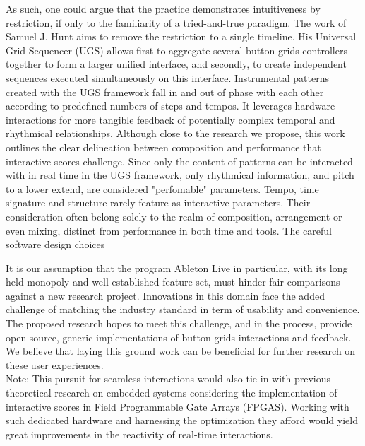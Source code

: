 \documentclass[journal,onecolumn]{IEEEtran}
\begin{document}
As such, one could argue that the practice demonstrates intuitiveness by restriction, if only to the familiarity of a tried-and-true paradigm. The work of Samuel J. Hunt\cite{hunt:poly} aims to remove the restriction to a single timeline. His Universal Grid Sequencer (UGS) allows first to aggregate several button grids controllers together to form a larger unified interface, and secondly, to create independent sequences executed simultaneously on this interface. Instrumental patterns created with the UGS framework fall in and out of phase with each other according to predefined numbers of steps and tempos. It leverages hardware interactions for more tangible feedback of potentially complex temporal and rhythmical relationships. Although close to the research we propose, this work outlines the clear delineation between composition and performance that interactive scores challenge. Since only the content of patterns can be interacted with in real time in the UGS framework, only rhythmical information, and pitch to a lower extend, are considered "perfomable" parameters. Tempo, time signature and structure rarely feature as interactive parameters. Their consideration often belong solely to the realm of composition, arrangement or even mixing, distinct from performance in both time and tools.
The careful software design choices

It is our assumption that the program Ableton Live in particular, with its long held monopoly and well established feature set, must hinder fair comparisons against a new research project. Innovations in this domain face the added challenge of matching the industry standard in term of usability and convenience. The proposed research hopes to meet this challenge, and in the process, provide open source, generic implementations of button grids interactions and feedback. We believe that laying this ground work can be beneficial for further research on these user experiences. \\

Note: This pursuit for seamless interactions would also tie in with previous theoretical research on embedded systems considering the implementation of interactive scores in Field Programmable Gate Arrays (FPGAS)\cite{arias:fpga}. Working with such dedicated hardware and harnessing the optimization they afford would yield great improvements in the reactivity of real-time interactions\cite{popoff:fpga}. 

\end{document}
